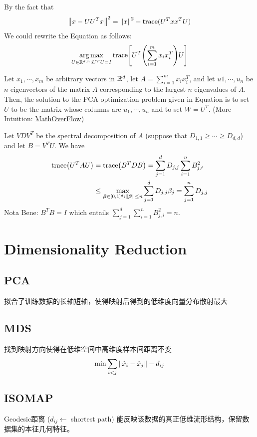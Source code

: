 \documentclass[a4paper,landscape]{article}
\begin{document}
\begin{tiny}
\begin{multicols}{4}
		By the fact that
		\[
			\norm{x-UU^Tx}^2=\norm{x}^2-\mathrm{trace}(U^Txx^TU)
		\] We could rewrite the Equation as follows:
		\[
			\mathop{\arg\max}_{U\in\mathbb{R}^{d,n}:U^TU=I}\mathrm{trace}\qty[U^T \qty(\sum^{m}_{i=1}x_ix_i^T) U]
		\]
		\begin{thm}
			Let $x_1,\cdots, x_m$ be arbitrary vectors in $\mathbb{R}^d$,
			let $A = \sum^{m}_{i=1}  x_ix_i^T$,
			and let $u1,\cdots, u_n$ be $n$ eigenvectors of the matrix $A$ corresponding to the largest $n$ eigenvalues of $A$.
			Then, the solution to the PCA optimization problem given in Equation is to set $U$ to be the matrix whose columns are $u_1,\cdots,u_n$ and to set $W = U^T$.
			(More Intuition: \href{https://mathoverflow.net/questions/248198/maximizing-trace-of-mathrm-vt-mathrm-a-mathrm-v-for-mathrm-a-symmetric}{MathOverFlow})
		\end{thm}
		\begin{prf}
			Let $VDV^T$ be the spectral decomposition of  $A$ (suppose that $D_{1,1}\ge \cdots\ge D_{d,d}$) and let $B=V^TU$. We have
			\[
				\begin{aligned}
					\mathrm{trace}\qty(U^TAU)
					 & =
					\mathrm{trace}\qty(B^TDB)
					=
					\sum^{d}_{j=1} D_{j,j}\sum^{n}_{i=1} B^2_{j,i}
					\\&\le
					\max_{\boldsymbol{\beta}\in[0,1]^d:\norm{\boldsymbol{\beta}}\le n}\sum^{d}_{j=1} D_{j,j}\beta_j
					=
					\sum^{n}_{j=1} D_{j,j}
				\end{aligned}
			\]
			Nota Bene: $B^TB=I$ which entails  $ \sum^{d}_{j=1} \sum^{n}_{i=1} B^2_{j,i}=n $.
		\end{prf}

		\section{Dimensionality Reduction}

		\subsection{PCA}
		拟合了训练数据的长轴短轴，使得映射后得到的低维度向量分布散射最大

		\subsection{MDS}
		找到映射方向使得在低维空间中高维度样本间距离不变
		\[
			\min \sum_{i<j}\norm{\hat{x}_i-\hat{x}_j}-d_{ij}
		\]

		\subsection{ISOMAP}
		Geodesic距离 ($d_{ij}\gets$ shortest path) 能反映该数据的真正低维流形结构，保留数据集的本征几何特征。


\end{multicols}
\end{tiny}
\end{document}

